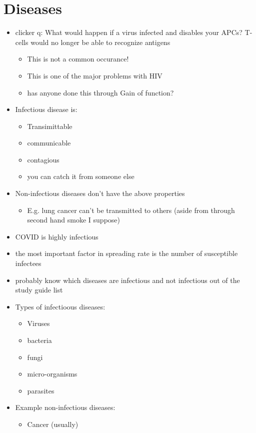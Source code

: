\documentclass{article}
\theoremstyle{definition}
\begin{document}
\section{Diseases}
\begin{itemize}
	\item clicker q: What would happen if a virus infected and disables your APCs? T-cells would no longer be able to recognize antigens
		\begin{itemize}
			\item This is not a common occurance!
			\item This is one of the major problems with HIV
			\item has anyone done this through Gain of function?
		\end{itemize}
	\item Infectious disease is:
		\begin{itemize}
			\item Transimittable
			\item communicable
			\item contagious
			\item you can catch it from someone else
		\end{itemize}
	\item Non-infectious diseases don't have the above properties
		\begin{itemize}
			\item E.g. lung cancer can't be transmitted to others (aside from through second hand smoke I suppose)
		\end{itemize}
	\item COVID is highly infectious
	\item the most important factor in spreading rate is the number of susceptible infectees
	\item probably know which diseases are infectious and not infectious out of the study guide list
	\item Types of infectioous diseases:
		\begin{itemize}
			\item Viruses
			\item bacteria
			\item fungi
			\item micro-organisms
			\item parasites
		\end{itemize}
	\item Example non-infectious diseases:
		\begin{itemize}
			\item Cancer (usually)

\end{itemize}
\end{itemize}
\end{document}
